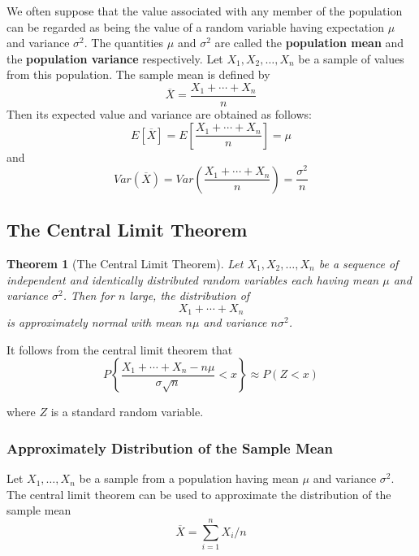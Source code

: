 \documentclass[12pt]{article}
\newtheorem{theorem}{Theorem}
\begin{document}
We often suppose that the value associated with any member of the population can be regarded as being the value of a random variable having expectation $\mu$ and variance $\sigma^2$. The quantities $\mu$ and $\sigma^2$ are called the \textbf{population mean} and the \textbf{population variance} respectively. Let $X_1, X_2, \dots, X_n$ be a sample of values from this population. The sample mean is defined by
\begin{equation*}
  \overline{X} = \frac{X_1 + \cdots + X_n}{n}
\end{equation*}
Then its expected value and variance are obtained as follows:
\begin{equation*}
  E[\overline{X}] = E \left[ \frac{X_1 + \cdots + X_n}{n} \right] = \mu
\end{equation*}
and
\begin{equation*}
  Var(\overline{X}) = Var \left( \frac{X_1 + \cdots + X_n}{n} \right)
= \frac{\sigma^2}{n}
\end{equation*}

\subsection{The Central Limit Theorem}

\begin{theorem} [The Central Limit Theorem]
  Let $X_1, X_2,\dots,X_n$ be a sequence of independent and identically distributed random variables each having mean $\mu$ and variance $\sigma^2$. Then for $n$ large, the distribution of
  \begin{equation*}
    X_1 + \cdots + X_n
  \end{equation*}
  is approximately normal with mean $n\mu$ and variance $n\sigma^2$.
\end{theorem}

It follows from the central limit theorem that
\begin{equation*}
  P \left\{ \frac {X_1 + \cdots + X_n - n\mu}{\sigma \sqrt{n}} < x \right\}
  \approx P(Z < x)
\end{equation*}

where $Z$ is a standard random variable.

\subsubsection{Approximately Distribution of the Sample Mean}

Let $X_1, \dots, X_n$ be a sample from a population having mean $\mu$ and variance $\sigma^2$. The central limit theorem can be used to approximate the distribution of the sample mean
\begin{equation*}
  \overline {X} = \sum_{i=1}^n X_i / n
\end{equation*}
\end{document}
